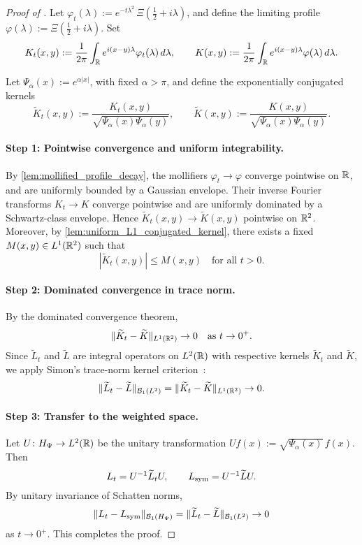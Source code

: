 \begin{proof}[Proof of ]
Let \( \varphi_t(\lambda) := e^{-t\lambda^2} \, \Xi\left( \tfrac{1}{2} + i\lambda \right) \), and define the limiting profile \( \varphi(\lambda) := \Xi\left( \tfrac{1}{2} + i\lambda \right) \). Set
\[
K_t(x,y) := \frac{1}{2\pi} \int_{\mathbb{R}} e^{i(x - y)\lambda} \varphi_t(\lambda)\, d\lambda, \qquad
K(x,y) := \frac{1}{2\pi} \int_{\mathbb{R}} e^{i(x - y)\lambda} \varphi(\lambda)\, d\lambda.
\]

Let \( \Psi_\alpha(x) := e^{\alpha |x|} \), with fixed \( \alpha > \pi \), and define the exponentially conjugated kernels
\[
\widetilde{K}_t(x,y) := \frac{K_t(x,y)}{\sqrt{\Psi_\alpha(x) \Psi_\alpha(y)}}, \qquad
\widetilde{K}(x,y) := \frac{K(x,y)}{\sqrt{\Psi_\alpha(x) \Psi_\alpha(y)}}.
\]

\paragraph{Step 1: Pointwise convergence and uniform integrability.}
By \cref{lem:mollified_profile_decay}, the mollifiers \( \varphi_t \to \varphi \) converge pointwise on \( \mathbb{R} \), and are uniformly bounded by a Gaussian envelope. Their inverse Fourier transforms \( K_t \to K \) converge pointwise and are uniformly dominated by a Schwartz-class envelope. Hence \( \widetilde{K}_t(x,y) \to \widetilde{K}(x,y) \) pointwise on \( \mathbb{R}^2 \). Moreover, by \cref{lem:uniform_L1_conjugated_kernel}, there exists a fixed \( M(x,y) \in L^1(\mathbb{R}^2) \) such that
\[
|\widetilde{K}_t(x,y)| \le M(x,y) \quad \text{for all } t > 0.
\]

\paragraph{Step 2: Dominated convergence in trace norm.}
By the dominated convergence theorem,
\[
\| \widetilde{K}_t - \widetilde{K} \|_{L^1(\mathbb{R}^2)} \to 0 \quad \text{as } t \to 0^+.
\]
Since \( \widetilde{L}_t \) and \( \widetilde{L} \) are integral operators on \( L^2(\mathbb{R}) \) with respective kernels \( \widetilde{K}_t \) and \( \widetilde{K} \), we apply Simon’s trace-norm kernel criterion~\cite[Thm.~3.1]{Simon2005TraceIdeals}:
\[
\| \widetilde{L}_t - \widetilde{L} \|_{\mathcal{B}_1(L^2)} = \| \widetilde{K}_t - \widetilde{K} \|_{L^1(\mathbb{R}^2)} \to 0.
\]

\paragraph{Step 3: Transfer to the weighted space.}
Let \( U \colon H_{\Psi} \to L^2(\mathbb{R}) \) be the unitary transformation \( Uf(x) := \sqrt{\Psi_\alpha(x)}\, f(x) \). Then
\[
L_t = U^{-1} \widetilde{L}_t U, \qquad L_{\mathrm{sym}} = U^{-1} \widetilde{L} U.
\]
By unitary invariance of Schatten norms,
\[
\| L_t - L_{\mathrm{sym}} \|_{\mathcal{B}_1(H_{\Psi})} = \| \widetilde{L}_t - \widetilde{L} \|_{\mathcal{B}_1(L^2)} \to 0
\]
as \( t \to 0^+ \). This completes the proof.
\end{proof}
